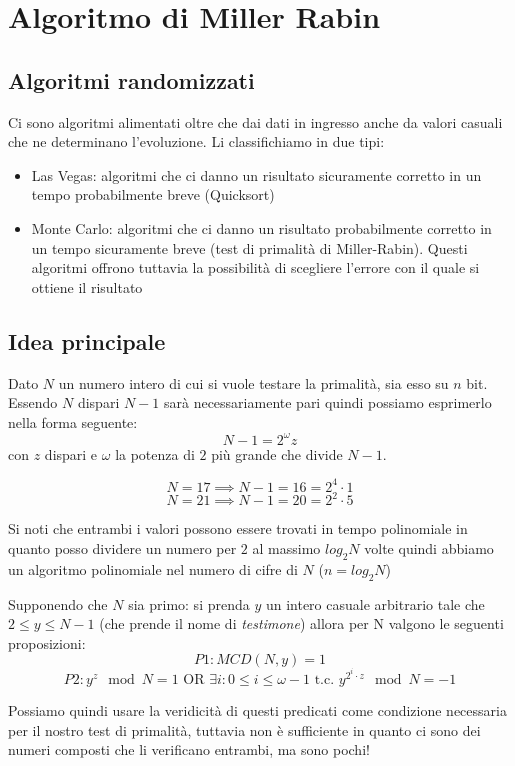 \section{Algoritmo di Miller Rabin}
\subsection{Algoritmi randomizzati}
Ci sono algoritmi alimentati oltre che dai dati in ingresso anche da valori casuali che ne determinano l'evoluzione. Li classifichiamo in due tipi:
\begin{itemize}
    \item Las Vegas: algoritmi che ci danno un risultato sicuramente corretto in un tempo probabilmente breve (Quicksort)
    \item Monte Carlo: algoritmi che ci danno un risultato probabilmente corretto in un tempo sicuramente breve (test di primalità di Miller-Rabin). Questi algoritmi offrono tuttavia la possibilità di scegliere l'errore con il quale si ottiene il risultato
\end{itemize}

\subsection{Idea principale}
Dato $N$ un numero intero di cui si vuole testare la primalità, sia esso su $n$ bit. Essendo $N$ dispari $N-1$ sarà necessariamente pari quindi possiamo esprimerlo nella forma seguente:
$$
    N-1 = 2^{\omega}z
$$
con $z$ dispari e $\omega$ la potenza di $2$ più grande che divide $N-1$.

$$ N = 17 \implies N-1 = 16 = 2^{4} \cdot 1 $$
$$ N = 21 \implies N-1 = 20 = 2^{2} \cdot 5 $$

Si noti che entrambi i valori possono essere trovati in tempo polinomiale in quanto posso dividere un numero per $2$ al massimo $log_2N$ volte quindi abbiamo un algoritmo polinomiale nel numero di cifre di $N$ ($n = log_2N$)

Supponendo che $N$ sia primo: si prenda $y$ un intero casuale arbitrario tale che $ 2 \leq y \leq N-1 $ (che prende il nome di \emph{testimone}) allora per N valgono le seguenti proposizioni:
$$ P1: MCD(N, y) = 1 $$
$$ P2: y^z \mod N = 1 \text{ OR } \exists i: 0 \leq i \leq \omega - 1 \text{ t.c. } y^{2^i \cdot z} \mod N = -1 $$

Possiamo quindi usare la veridicità di questi predicati come condizione necessaria per il nostro test di primalità, tuttavia non è sufficiente in quanto ci sono dei numeri composti che li verificano entrambi, ma sono pochi!

